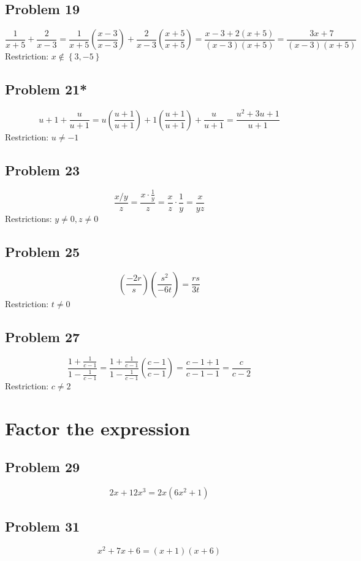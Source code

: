 \documentclass[11pt, oneside]{article}   	%
\begin{document}
\subsection{Problem 19}
$$\frac{1}{x+5}+\frac{2}{x-3}
= \frac{1}{x+5} \left(\frac{x-3}{x-3}\right) + \frac{2}{x-3} \left(\frac{x+5}{x+5}\right) 
= \frac{x-3+2(x+5)}{(x-3) (x+5)}
= \frac{3 x+7}{(x-3) (x+5)}$$
Restriction: $x\notin\left\{3,-5\right\}$

\subsection{Problem 21*}
$$u + 1 + \frac{u}{u+1} = u\left(\frac{u+1}{u+1}\right) + 1\left(\frac{u+1}{u+1}\right) + \frac{u}{u+1} = \frac{u^2+3 u+1}{u+1}$$
Restriction: $u\ne-1$

\subsection{Problem 23}
$$\frac{x/y}{z}
 = \frac{x\cdot \frac{1}{y}}{z}
 = \frac{x}{z}\cdot\frac{1}{y}
 = \frac{x}{y z}$$
Restrictions: $y\ne0, z\ne0$

\subsection{Problem 25}
$$\left(\frac{-2 r}{ s}\right) \left(\frac{s^2}{-6 t}\right) = \frac{r s}{3 t}$$
Restriction: $t\ne0$

\subsection{Problem 27}
$$\frac{1 + \frac{1}{c-1}}{1 - \frac{1}{c-1}} 
= \frac{1 + \frac{1}{c-1}}{1 - \frac{1}{c-1}} \left( \frac{c-1}{c-1}\right)
= \frac{c-1 + 1}{c-1 - 1}
= \frac{c}{c-2}$$
Restriction: $c\ne2$


\section{Factor the expression}

\subsection{Problem 29}
$$2 x + 12 x^3 = 2 x \left(6 x^2+1\right)$$

\subsection{Problem 31}
$$x^2+7 x+6 = (x+1) (x+6)$$
\end{document}
